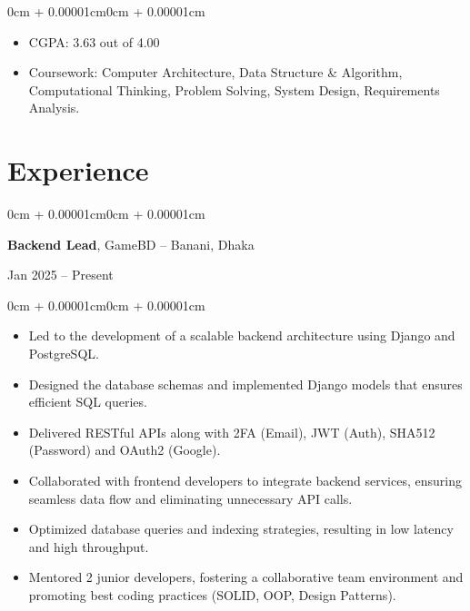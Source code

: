 \documentclass[10pt, letterpaper]{article}
\newenvironment{highlights}{
  \begin{itemize}[
    topsep=0.10cm,
    parsep=0.10cm,
    partopsep=0pt,
    itemsep=0pt,
    leftmargin=0cm + 10pt
  ]
}{
  \end{itemize}
}
\newenvironment{onecolentry}{\begin{adjustwidth}{0cm + 0.00001cm}{0cm + 0.00001cm}}{\end{adjustwidth}}
\newenvironment{twocolentry}[2][]{
  \onecolentry
  \def\secondColumn{#2}
  \setcolumnwidth{\fill, 4.5cm}
  \begin{paracol}{2}
}{
  \switchcolumn \raggedleft \secondColumn
  \end{paracol}
  \endonecolentry
}
\begin{document}
\vspace{0.10cm}

\begin{onecolentry}
  \begin{highlights}
    \item CGPA: 3.63 out of 4.00
    \item Coursework: Computer Architecture, Data Structure \& Algorithm, Computational Thinking, Problem Solving, System Design, Requirements Analysis.
  \end{highlights}
\end{onecolentry}

\section{Experience}

\begin{twocolentry}{Jan 2025 -- Present}
  \textbf{Backend Lead}, GameBD -- Banani, Dhaka
\end{twocolentry}

\vspace{0.10cm}

\begin{onecolentry}
  \begin{highlights}
    \item Led to the development of a scalable backend architecture using Django and PostgreSQL.
    \item Designed the database schemas and implemented Django models that ensures efficient SQL queries.
    \item Delivered RESTful APIs along with 2FA (Email), JWT (Auth), SHA512 (Password) and OAuth2 (Google).
    \item Collaborated with frontend developers to integrate backend services, ensuring seamless data flow and eliminating unnecessary API calls.
    \item Optimized database queries and indexing strategies, resulting in low latency and high throughput.
    \item Mentored 2 junior developers, fostering a collaborative team environment and promoting best coding practices (SOLID, OOP, Design Patterns).
  \end{highlights}
\end{onecolentry}

\vspace{0.20cm}
\end{document}

